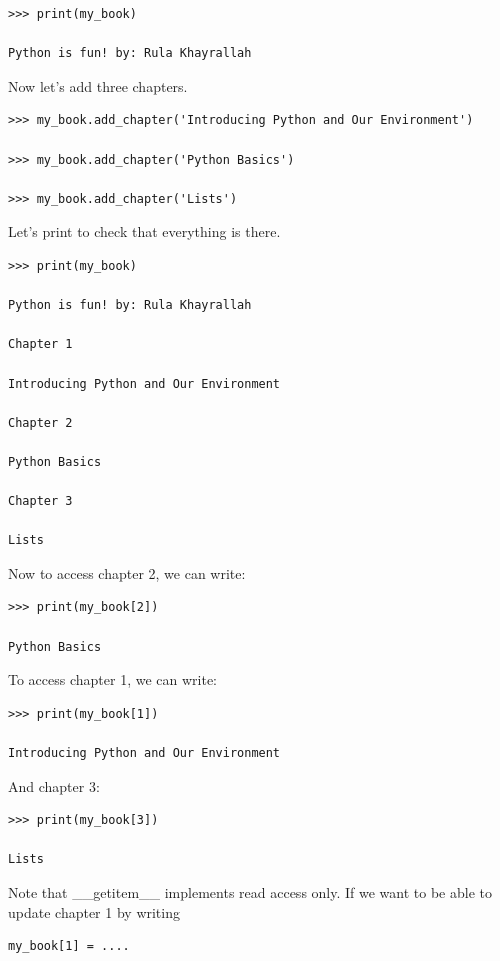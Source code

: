 \documentclass{article}
\begin{document}
\begin{lstlisting}
>>> print(my_book)

Python is fun! by: Rula Khayrallah
\end{lstlisting}

Now let's add three chapters.

\begin{lstlisting}
>>> my_book.add_chapter('Introducing Python and Our Environment')

>>> my_book.add_chapter('Python Basics')

>>> my_book.add_chapter('Lists')
\end{lstlisting}

Let's print  to check that everything is there.

\begin{lstlisting}
>>> print(my_book)

Python is fun! by: Rula Khayrallah

Chapter 1

Introducing Python and Our Environment

Chapter 2

Python Basics

Chapter 3

Lists
\end{lstlisting}

Now to access chapter 2, we can write:

\begin{lstlisting}
>>> print(my_book[2])

Python Basics
\end{lstlisting}

To access chapter 1, we can write:

\begin{lstlisting}
>>> print(my_book[1])

Introducing Python and Our Environment
\end{lstlisting}

And chapter 3:

\begin{lstlisting}
>>> print(my_book[3])

Lists
\end{lstlisting}

Note that {\_}{\_}getitem{\_}{\_} implements read access only.  If we want to be able to update chapter 1 by writing
\begin{lstlisting}
my_book[1] = ....
\end{lstlisting}
\end{document}
